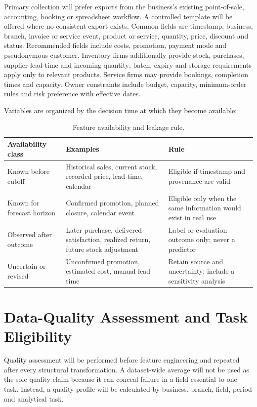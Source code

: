 Primary collection will prefer exports from the business's existing
point-of-sale, accounting, booking or spreadsheet workflow. A controlled
template will be offered where no consistent export exists. Common fields are
timestamp, business, branch, invoice or service event, product or service,
quantity, price, discount and status. Recommended fields include costs,
promotion, payment mode and pseudonymous customer. Inventory firms additionally
provide stock, purchases, supplier lead time and incoming quantity; batch,
expiry and storage requirements apply only to relevant products. Service firms
may provide bookings, completion times and capacity. Owner constraints include
budget, capacity, minimum-order rules and risk preference with effective dates.

Variables are organized by the decision time at which they become available:

\begin{table}[H]
\centering
\small
\caption{Feature availability and leakage rule.}
\label{tab:feature_availability}
\begin{tabularx}{\textwidth}{|p{}|p{}|Y|}
\hline
\textbf{Availability class} & \textbf{Examples} & \textbf{Rule} \\
\hline
Known before cutoff & Historical sales, current stock, recorded price, lead time, calendar & Eligible if timestamp and provenance are valid \\
Known for forecast horizon & Confirmed promotion, planned closure, calendar event & Eligible only when the same information would exist in real use \\
Observed after outcome & Later purchase, delivered satisfaction, realized return, future stock adjustment & Label or evaluation outcome only; never a predictor \\
Uncertain or revised & Unconfirmed promotion, estimated cost, manual lead time & Retain source and uncertainty; include a sensitivity analysis \\
\hline
\end{tabularx}
\end{table}

\section{Data-Quality Assessment and Task Eligibility}

Quality assessment will be performed before feature engineering and repeated
after every structural transformation. A dataset-wide average will not be used
as the sole quality claim because it can conceal failure in a field essential
to one task. Instead, a quality profile will be calculated by business, branch,
field, period and analytical task.

